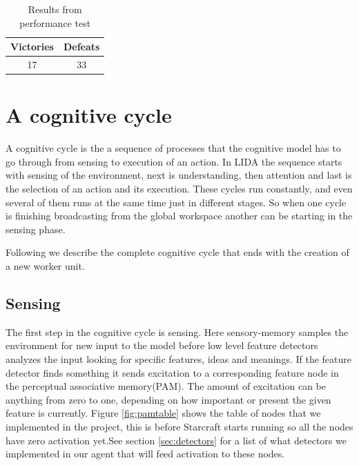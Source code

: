 \begin{table}
\begin{center}
\begin{tabular}{| c | c |}
  \hline                        
  Victories & Defeats\\
  \hline
  17 & 33 \\
  \hline  
\end{tabular}
\caption{Results from performance test}
\label{tab:test_results}
\end{center}
\end{table}
\section{A cognitive cycle}
A cognitive cycle is the a sequence of processes that the cognitive model has to go through from sensing to execution of an action. In LIDA the sequence starts with sensing of the environment, next is understanding, then attention and last is the selection of an action and its execution. These cycles run constantly, and even several of them runs at the same time just in different stages. So when one cycle is finishing broadcasting from the global workspace another can be starting in the sensing phase. 

Following we describe the complete cognitive cycle that ends with the creation of a new worker unit. 	

\subsection{Sensing}
The first step in the cognitive cycle is sensing. Here sensory-memory samples the environment for new input to the model before low level feature detectors analyzes the input looking for specific features, ideas and meanings. If the feature detector finds something it sends excitation to a corresponding feature node in the perceptual associative memory(PAM). The amount of excitation can be anything from zero to one, depending on how important or present the given feature is currently. Figure \ref{fig:pamtable} shows the table of nodes that we implemented in the project, this is before Starcraft starts running so all the nodes have zero activation yet.See section \ref{sec:detectors} for a list of what detectors we implemented in our agent that will feed activation to these nodes. 

